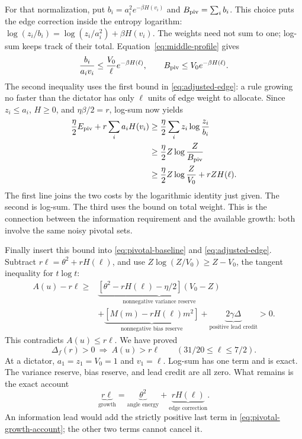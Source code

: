 For that normalization, put
\(b_i=a_i^2e^{-\beta H(v_i)}\) and \(B_{\rm piv}=\sum_i b_i\).
This choice puts the edge correction inside the entropy logarithm:
\(\log(z_i/b_i)=\log(z_i/a_i^2)+\beta H(v_i)\).
The weights need not sum to one; log-sum keeps track of their total.
Equation~\eqref{eq:middle-profile} gives
\[
 \frac{b_i}{a_iv_i}
 \le\frac{V_0}{\ell}e^{-\beta H(\ell)},\qquad
 B_{\rm piv}\le V_0e^{-\beta H(\ell)}.
\]
The second inequality uses the first bound in
\eqref{eq:adjusted-edge}: a rule growing no faster than the dictator
has only \(\ell\) units of edge weight to allocate.
Since \(z_i\le a_i\), \(H\ge0\), and
\(\eta\beta/2=r\), log-sum now yields
\begin{align*}
 \frac{\eta}{2}E_{\rm piv}+r\sum_i a_iH(v_i)
 &\ge\frac{\eta}{2}\sum_i z_i\log\frac{z_i}{b_i}\\
 &\ge\frac{\eta}{2}Z\log\frac Z{B_{\rm piv}}\\
 &\ge\frac{\eta}{2}Z\log\frac Z{V_0}+rZH(\ell).
\end{align*}
The first line joins the two costs by the logarithmic identity just
given. The second is log-sum. The third uses the bound on total weight.
This is the connection between the information requirement and the
available growth: both involve the same noisy pivotal sets.

Finally insert this bound into \eqref{eq:pivotal-baseline} and
\eqref{eq:adjusted-edge}. Subtract
\(r\ell=\theta^2+rH(\ell)\), and use
\(Z\log(Z/V_0)\ge Z-V_0\), the tangent inequality for \(t\log t\):
\begin{equation}
 \begin{aligned}
 A(u)-r\ell\ge{}&
 \underbrace{[\theta^2-rH(\ell)-\eta/2](V_0-Z)}_{
                    \text{nonnegative variance reserve}}\\
 &+\underbrace{[M(m)-rH(\ell)m^2]}_{\text{nonnegative bias reserve}}
  +\underbrace{2\gamma\Delta}_{\text{positive lead credit}}>0.
 \end{aligned}
 \label{eq:pivotal-growth-account}
\end{equation}
This contradicts \(A(u)\le r\ell\). We have proved
\[
 \Delta_f(r)>0\ \Longrightarrow\ A(u)>r\ell
 \qquad(31/20\le\ell\le7/2).
\]
At a dictator, \(a_1=z_1=V_0=1\) and \(v_1=\ell\).
Log-sum has one term and is exact. The variance reserve, bias reserve,
and lead credit are all zero. What remains is the exact account
\[
 \underbrace{r\ell}_{\text{growth}}
   =\underbrace{\theta^2}_{\text{angle energy}}
    +\underbrace{rH(\ell)}_{\text{edge correction}}.
\]
An information lead would add the strictly positive last term in
\eqref{eq:pivotal-growth-account}; the other two terms cannot cancel it.
